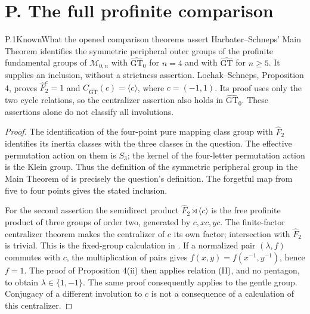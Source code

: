 \section{P. The full profinite comparison}

\begin{statement}{P.1}{Known}{What the opened comparison theorems assert}
Harbater--Schneps' Main Theorem identifies the symmetric peripheral outer
groups of the profinite fundamental groups of $\mathcal M_{0,n}$ with
$\widehat{\mathrm{GT}}_0$ for $n=4$ and with
$\widehat{\mathrm{GT}}$ for $n\geq5$.
It supplies an inclusion, without a strictness assertion.
Lochak--Schneps, Proposition 4, proves
$\widehat F_2^{c}=1$ and
$C_{\widehat{\mathrm{GT}}}(c)=\langle c\rangle$, where
$c=(-1,1)$. Its proof uses only the two cycle relations, so the
centralizer assertion also holds in $\widehat{\mathrm{GT}}_0$.
These assertions alone do not classify all involutions.
\end{statement}
\begin{proof}
The identification of the four-point pure mapping class group with
$\widehat F_2$ identifies its inertia classes with the three classes
in the question. The effective permutation action on them is $S_3$;
the kernel of the four-letter permutation action is the Klein group.
Thus the definition of the symmetric peripheral group in the Main
Theorem of \cite{PBC_HS2000} is precisely the question's definition.
The forgetful map from five to four points gives the stated inclusion.

For the second assertion the semidirect product
$\widehat F_2\rtimes\langle c\rangle$ is the free profinite product of
three groups of order two, generated by $c,xc,yc$. The finite-factor
centralizer theorem makes the centralizer of $c$ its own factor;
intersection with $\widehat F_2$ is trivial. This is the fixed-group
calculation in \cite[Proposition 4(i)]{PBC_LS1997}. If a normalized pair
$(\lambda,f)$ commutes with $c$, the multiplication of pairs gives
$f(x,y)=f(x^{-1},y^{-1})$, hence $f=1$. The proof of Proposition 4(ii)
then applies relation (II), and no pentagon, to obtain
$\lambda\in\{1,-1\}$. The same proof consequently applies to the gentle
group. Conjugacy of a different involution to $c$ is not a consequence
of a calculation of this centralizer.
\end{proof}

